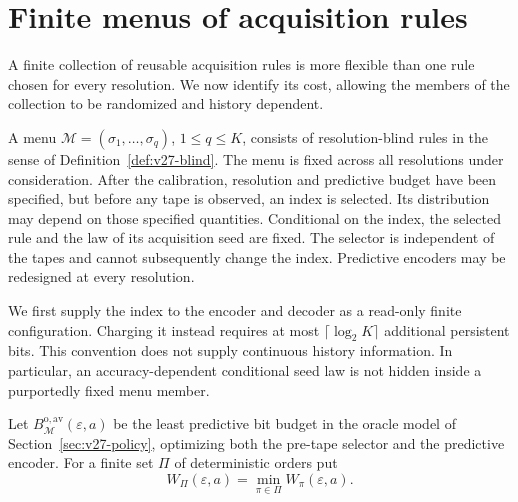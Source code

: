 \section{Finite menus of acquisition rules}
\label{sec:v27-menus}
A finite collection of reusable acquisition rules is more flexible than one rule chosen for every resolution. We now identify its cost, allowing the members of the collection to be randomized and history dependent.

\begin{definition}\label{def:v27-menu}
A menu $\mathcal M=(\sigma_1,\ldots,\sigma_q)$, $1\le q\le K$, consists of resolution-blind rules in the sense of Definition~\ref{def:v27-blind}. The menu is fixed across all resolutions under consideration. After the calibration, resolution and predictive budget have been specified, but before any tape is observed, an index is selected. Its distribution may depend on those specified quantities. Conditional on the index, the selected rule and the law of its acquisition seed are fixed. The selector is independent of the tapes and cannot subsequently change the index. Predictive encoders may be redesigned at every resolution.
\end{definition}

We first supply the index to the encoder and decoder as a read-only finite configuration. Charging it instead requires at most $\lceil\log_2K\rceil$ additional persistent bits. This convention does not supply continuous history information. In particular, an accuracy-dependent conditional seed law is not hidden inside a purportedly fixed menu member.

Let $B^{\mathrm{o,av}}_{\mathcal M}(\varepsilon,a)$ be the least predictive bit budget in the oracle model of Section~\ref{sec:v27-policy}, optimizing both the pre-tape selector and the predictive encoder. For a finite set $\Pi$ of deterministic orders put
\[
             W_\Pi(\varepsilon,a)=\min_{\pi\in\Pi}W_\pi(\varepsilon,a).
\]

